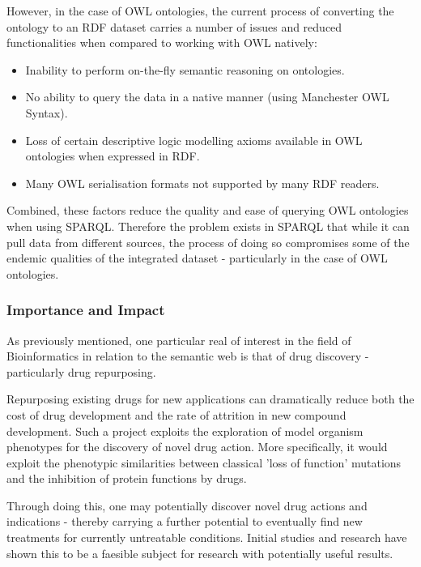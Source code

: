 \documentclass{article}
\begin{document}
However, in the case of OWL ontologies, the current process of converting the
ontology to an RDF dataset carries a number of issues and reduced
functionalities when compared to working with OWL natively:

\begin{itemize}
  \item Inability to perform on-the-fly semantic reasoning on ontologies.
  \item No ability to query the data in a native manner (using Manchester OWL Syntax).
  \item Loss of certain descriptive logic modelling axioms available in OWL
  ontologies when expressed in RDF.
  \item Many OWL serialisation formats not supported by many RDF readers.
\end{itemize}

Combined, these factors reduce the quality and ease of querying OWL ontologies when 
using SPARQL. Therefore the problem exists in SPARQL that while it can pull data
from different sources, the process of doing so compromises some of the endemic
qualities of the integrated dataset - particularly in the case of OWL
ontologies.

\subsubsection{Importance and Impact}


As previously mentioned, one particular real of interest in the field of
Bioinformatics in relation to the semantic web is that of drug discovery -
particularly drug repurposing\cite{pharmgkb}.

Repurposing existing drugs for new applications can dramatically reduce both
the cost of drug development and the rate of attrition in new compound
development. Such a project exploits the exploration of model organism
phenotypes for the discovery of novel drug action. More specifically, it would
exploit the phenotypic similarities between classical 'loss of function'
mutations and the inhibition of protein functions by drugs.

Through doing this, one may potentially discover novel drug actions and
indications - thereby carrying a further potential to eventually find new treatments for
currently untreatable conditions. Initial studies and research have shown this
to be a faesible subject for research with potentially useful
results.\cite{drugrepurposeinitial}
\end{document}
